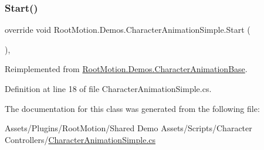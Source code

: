 \subsubsection{\texorpdfstring{Start()}{Start()}}
{\footnotesize\ttfamily override void Root\+Motion.\+Demos.\+Character\+Animation\+Simple.\+Start (\begin{DoxyParamCaption}{ }\end{DoxyParamCaption})\hspace{0.3cm}{\ttfamily [protected]}, {\ttfamily [virtual]}}



Reimplemented from \mbox{\hyperlink{class_root_motion_1_1_demos_1_1_character_animation_base_a4ddfae1bf92b14f0f1bb9ddd56ed093d}{Root\+Motion.\+Demos.\+Character\+Animation\+Base}}.



Definition at line 18 of file Character\+Animation\+Simple.\+cs.



The documentation for this class was generated from the following file\+:\begin{DoxyCompactItemize}
\item 
Assets/\+Plugins/\+Root\+Motion/\+Shared Demo Assets/\+Scripts/\+Character Controllers/\mbox{\hyperlink{_character_animation_simple_8cs}{Character\+Animation\+Simple.\+cs}}\end{DoxyCompactItemize}
